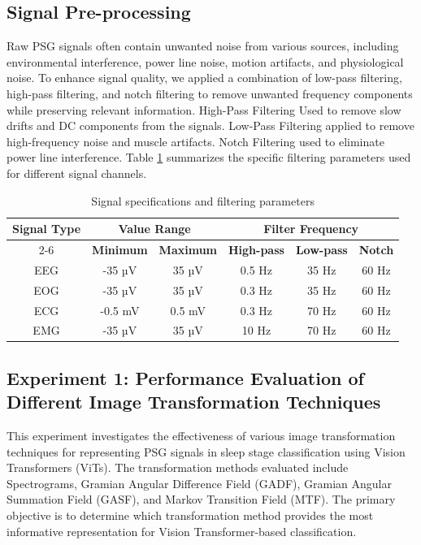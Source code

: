 \subsection{Signal Pre-processing}

Raw PSG signals often contain unwanted noise from various sources, including environmental interference, power line noise, motion artifacts, and physiological noise. To enhance signal quality, we applied a combination of low-pass filtering, high-pass filtering, and notch filtering to remove unwanted frequency components while preserving relevant information. High-Pass Filtering Used to remove slow drifts and DC components from the signals. Low-Pass Filtering applied to remove high-frequency noise and muscle artifacts.
Notch Filtering used to eliminate power line interference. Table \ref{tab:signal_specs} summarizes the specific filtering parameters used for different signal channels.

\begin{table}[H]
    \centering
    \renewcommand{\arraystretch}{0.7}
    \begin{tabular}{|c|c|c|c|c|c|}
        \hline
        \multirow{2}{*}{\textbf{Signal Type}} & \multicolumn{2}{c|}{\textbf{Value Range}} & \multicolumn{3}{c|}{\textbf{Filter Frequency}} \\
        \cline{2-6}
        & \textbf{Minimum} & \textbf{Maximum} & \textbf{High-pass} & \textbf{Low-pass} & \textbf{Notch} \\
        \hline
        EEG & -35 µV & 35 µV & 0.5 Hz & 35 Hz & 60 Hz \\
        \hline
        EOG & -35 µV & 35 µV & 0.3 Hz & 35 Hz & 60 Hz \\
        \hline
        ECG & -0.5 mV & 0.5 mV & 0.3 Hz & 70 Hz & 60 Hz \\
        \hline
        EMG & -35 µV & 35 µV & 10 Hz & 70 Hz & 60 Hz \\
        \hline
        
    \end{tabular}
    \caption{Signal specifications and filtering parameters}
    \label{tab:signal_specs}
\end{table}

\subsection{Experiment 1: Performance Evaluation of Different Image Transformation Techniques}

This experiment investigates the effectiveness of various image transformation techniques for representing PSG signals in sleep stage classification using Vision Transformers (ViTs). The transformation methods evaluated include Spectrograms, Gramian Angular Difference Field (GADF), Gramian Angular Summation Field (GASF), and Markov Transition Field (MTF). The primary objective is to determine which transformation method provides the most informative representation for Vision Transformer-based classification. \\

